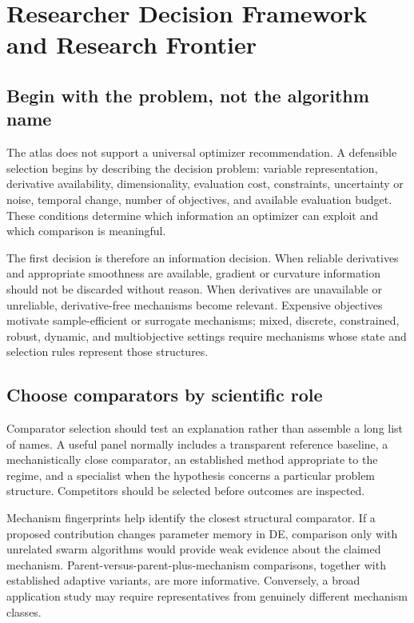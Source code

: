 \section{Researcher Decision Framework and Research Frontier}
\label{sec:decision}

\subsection{Begin with the problem, not the algorithm name}

The atlas does not support a universal optimizer recommendation. A defensible selection begins by describing the decision problem: variable representation, derivative availability, dimensionality, evaluation cost, constraints, uncertainty or noise, temporal change, number of objectives, and available evaluation budget. These conditions determine which information an optimizer can exploit and which comparison is meaningful.

The first decision is therefore an information decision. When reliable derivatives and appropriate smoothness are available, gradient or curvature information should not be discarded without reason. When derivatives are unavailable or unreliable, derivative-free mechanisms become relevant. Expensive objectives motivate sample-efficient or surrogate mechanisms; mixed, discrete, constrained, robust, dynamic, and multiobjective settings require mechanisms whose state and selection rules represent those structures.

\subsection{Choose comparators by scientific role}

Comparator selection should test an explanation rather than assemble a long list of names. A useful panel normally includes a transparent reference baseline, a mechanistically close comparator, an established method appropriate to the regime, and a specialist when the hypothesis concerns a particular problem structure. Competitors should be selected before outcomes are inspected.

Mechanism fingerprints help identify the closest structural comparator. If a proposed contribution changes parameter memory in DE, comparison only with unrelated swarm algorithms would provide weak evidence about the claimed mechanism. Parent-versus-parent-plus-mechanism comparisons, together with established adaptive variants, are more informative. Conversely, a broad application study may require representatives from genuinely different mechanism classes.

